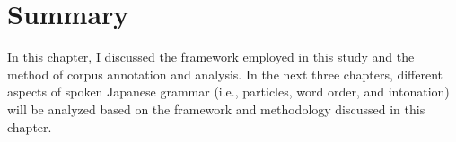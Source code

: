 




%


\section{Summary}

In this chapter,
I discussed
the framework employed in this study and
the method of corpus annotation and analysis.
In the next three chapters,
different aspects of spoken Japanese grammar (i.e., particles, word order, and intonation) will be analyzed based on the framework and methodology discussed in this chapter.








